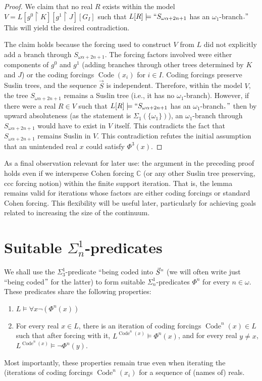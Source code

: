 \documentclass[a4paper,11pt]{article}
\begin{document}
\begin{proof}
We claim that no real $R$ exists within the model $V = L[g^0 \upharpoonright K][g^1 \upharpoonright J][G_I]$ such that $L[R] \models ``S_{\omega \alpha + 2n+1}$ has an $\omega_1$-branch$."$ This will yield the desired contradiction.

The claim holds because the forcing used to construct $V$ from $L$ did not explicitly add a branch through $S_{\omega \alpha + 2n+1}$. The forcing factors involved were either components of $g^0$ and $g^1$ (adding branches through other trees determined by $K$ and $J$) or the coding forcings $\operatorname{Code}(x_i)$ for $i \in I$. Coding forcings preserve Suslin trees, and the sequence $\vec{S}$ is independent. Therefore, within the model $V$, the tree $S_{\omega \alpha + 2n+1}$ remains a Suslin tree (i.e., it has no $\omega_1$-branch).
However, if there were a real $R \in V$ such that $L[R] \models ``S_{\omega \alpha + 2n+1}$ has an $\omega_1$-branch$,"$ then by upward absoluteness (as the statement is $\Sigma_1(\{\omega_1\})$), an $\omega_1$-branch through $S_{\omega \alpha + 2n+1}$ would have to exist in $V$ itself. This contradicts the fact that $S_{\omega \alpha + 2n+1}$ remains Suslin in $V$.
This contradiction refutes the initial assumption that an unintended real $x$ could satisfy $\Phi^3(x)$.
\end{proof}

As a final observation relevant for later use: the argument in the preceding proof holds even if we intersperse Cohen forcing $\mathbb{C}$ (or any other Suslin tree preserving, ccc forcing notion) within the finite support iteration. That is, the lemma remains valid for iterations whose factors are either coding forcings or standard Cohen forcing. This flexibility will be useful later, particularly for achieving goals related to increasing the size of the continuum.




\section{Suitable $\Sigma^1_n$-predicates}

We shall use the $\Sigma^1_3$-predicate ``being coded into $\vec{S}"$ (we will often write just ``being coded$"$ for the latter) to form suitable $\Sigma^1_n$-predicates $\Phi^n$ for every $n \in \omega$. These predicates share the following properties:
\begin{enumerate}
\item $L \models \forall x  \lnot(\Phi^n (x))$
\item For every real $x \in L$, there is an iteration of coding forcings $\operatorname{Code}^n (x) \in L$ such that after forcing with it, $L^{\operatorname{Code}^n (x)} \models \Phi^n (x)$, and for every real $y \ne x$, $L^{\operatorname{Code}^n (x)} \models \lnot \Phi^n(y)$.
\end{enumerate}
Most importantly, these properties remain true even when iterating the (iterations of coding forcings
$\operatorname{Code}^n (x_i)$ for a sequence of (names of) reals.
\end{document}
